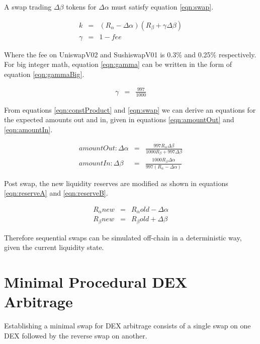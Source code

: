 \documentclass[runningheads]{llncs}
\begin{document}
	A swap trading \( \Delta\beta\) tokens for \( \Delta\alpha \) must satisfy equation \ref{eqn:swap}.
	
	\begin{eqnarray}
		k  &=& (R_{\alpha} - \Delta\alpha)  (R_{\beta} + \gamma\Delta\beta ) \label{eqn:swap}\\
		\gamma  &=& 1 - fee \label{eqn:gamma}
	\end{eqnarray}
	
	Where the fee on UniswapV02 and SushiswapV01 is 0.3\% and 0.25\% respectively. For big integer math, equation \ref{eqn:gamma} can be written in the form of equation \ref{eqn:gammaBig}.
	
	\begin{eqnarray}
		\gamma  &=& \frac{997}{1000} \label{eqn:gammaBig}
	\end{eqnarray}
	
	From equations \ref{eqn:constProduct} and \ref{eqn:swap} we can derive an equations for the expected amounts out and in, given in equations \ref{eqn:amountOut} and \ref{eqn:amountIn}. 
	
	\begin{eqnarray}
		amountOut: \Delta\alpha  &=& \frac{997 R_{\alpha} \Delta\beta }{1000 R_{\beta} + 997 \Delta\beta} \label{eqn:amountOut}\\
		amountIn: \Delta\beta  &=& \frac{1000 R_{\beta} \Delta\alpha }{997 (R_{\alpha} - \Delta\alpha)} \label{eqn:amountIn}
	\end{eqnarray}
	
	Post swap, the new liquidity reserves are modified as shown in equations \ref{eqn:reserveA} and \ref{eqn:reserveB}.
	
	\begin{eqnarray}
		R_{\alpha}{new}  &=& R_{\alpha}{old} - \Delta\alpha  \label{eqn:reserveA}\\
		R_{\beta}{new}  &=& R_{\beta}{old} + \Delta\beta  \label{eqn:reserveB}
	\end{eqnarray}
	
	Therefore sequential swaps can be simulated off-chain in a deterministic way, given the current liquidity state.
	
	\section{Minimal Procedural DEX Arbitrage}
	Establishing a minimal swap for DEX arbitrage consists of a single swap on one DEX followed by the reverse swap on another.
	
\end{document}
